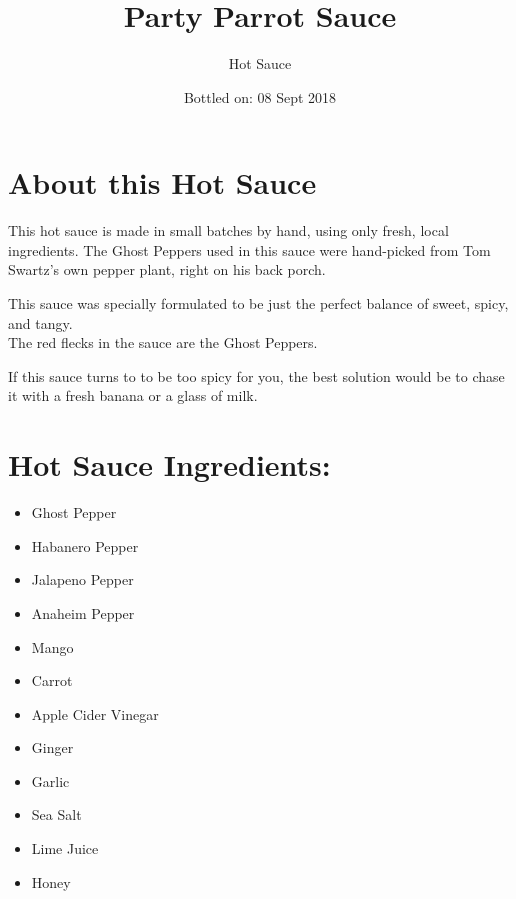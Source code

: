 \documentclass[10pt,foldmark,notumble]{leaflet}
\title{Party Parrot Sauce}
\author{Hot Sauce}
\date{Bottled on: 08 Sept 2018}
\begin{document}
\maketitle
\thispagestyle{empty}
\section{About this Hot Sauce \color{red}\hrulefill\color{black}}
This hot sauce is made in small batches by hand, using only fresh,
local ingredients. The Ghost Peppers used in this sauce were
hand-picked from Tom Swartz's own pepper plant, right on his back porch.

This sauce was specially formulated to be just the perfect balance of
sweet, spicy, and tangy.\\
The red flecks in the sauce are the Ghost Peppers.

If this sauce turns to to be too spicy for you,
the best solution would be to chase it with a fresh banana or a glass of milk.

\section{Hot Sauce Ingredients: \color{red}\hrulefill\color{black}}
\begin{itemize}
        \item Ghost Pepper
        \item Habanero Pepper
        \item Jalapeno Pepper
        \item Anaheim Pepper
        \item Mango
        \item Carrot
        \item Apple Cider Vinegar
        \item Ginger
        \item Garlic
        \item Sea Salt
        \item Lime Juice
        \item Honey
\end{itemize}
\end{document}
